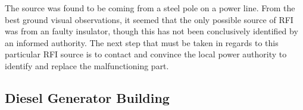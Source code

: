 \documentclass[a4paper,12pt]{article}
\begin{document}
                                                                                                                                                                                                                                                                                                                                                                                                                        The source was found to be coming from a steel pole on a power line. From the best ground visual observations, it seemed that the only possible source of RFI was from an faulty insulator, though this has not been conclusively identified by an informed authority. 
                                                                                                                                                                                                                                                                                                                                                                                                                                            The next step that must be taken in regards to this particular RFI source is to contact and convince the local power authority to identify and replace the malfunctioning part.

                                                                                                                                                                                                                                                                                                                                                                                                                                                                \subsection{Diesel Generator Building}
                                                                                                                                                                                                                                                                                                                                                                                                                                                                                    \label{dieselgeneratorbuilding}
\end{document}
